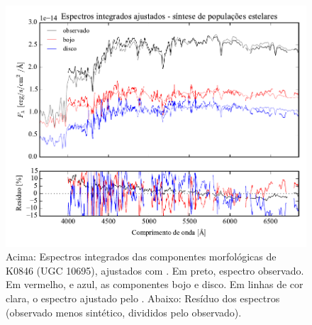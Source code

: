 \begin{figure}
	\includegraphics[page=11,width=\textwidth]{figuras/sample006a_synthesis}
	\caption[Espectros ajustados com \starlight das componentes morfológicas de
	K0846 (UGC 10695)]
	{Acima: Espectros integrados das componentes morfológicas de
	K0846 (UGC 10695), ajustados com \starlight. Em preto, espectro observado. Em
	vermelho, e azul, as componentes bojo e disco. Em linhas de cor clara, o
	espectro ajustado pelo \starlight. Abaixo: Resíduo dos espectros (observado
	menos sintético, divididos pelo observado).}
	\label{fig:decompSintese:K0846}
\end{figure}

